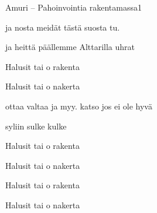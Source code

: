 \documentclass[12pt,a4paper]{article}
\begin{document}
\thispagestyle{empty}
\begin{mysong}{Amuri – Pahoinvointia rakentamassa}{1}

\begin{SBVerse}
   ja nosta meidät  tästä suosta 
  tu.

   ja heittä päällemme  Alttarilla
   uhrat
\end{SBVerse}

\begin{SBChorus}
  Halusit tai  o 
  rakenta
  
  Halusit tai  o 
  nakerta
\end{SBChorus}

\begin{SBVerse}
   ottaa valtaa ja  myy.  katso
   jos ei ole hyvä 

   syliin sulke 
   kulke
\end{SBVerse}

\begin{SBChorus}
  Halusit tai  o 
  rakenta
  
  Halusit tai  o 
  nakerta

  Halusit tai  o 
  rakenta
  
  Halusit tai  o 
  nakerta
\end{SBChorus}

\end{mysong}
\end{document}

